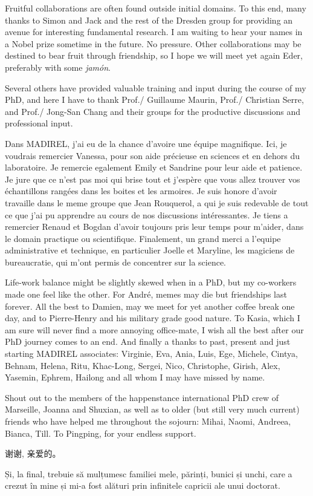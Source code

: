 Fruitful collaborations are often found outside initial domains. 
To this end, many thanks to Simon and Jack and the rest of the Dresden 
group for providing an avenue for interesting fundamental research.
I am waiting to hear your names in a Nobel prize sometime in the
future. No pressure. Other collaborations may be destined to bear fruit
through friendship, so I hope we will meet yet again Eder, preferably 
with some \textit{jamón}.

Several others have provided valuable training and input during the 
course of my PhD, and here I have to thank Prof./ Guillaume Maurin,
Prof./ Christian Serre, and Prof./ Jong-San Chang and their groups
for the productive discussions and professional input.

Dans MADIREL, j'ai eu de la chance d'avoire une équipe magnifique.
Ici, je voudrais remercier Vanessa, pour son aide précieuse en sciences
et en dehors du laboratoire.
Je remercie egalement Emily et Sandrine pour leur aide et patience.
Je jure que ce n'est pas moi qui brise tout et j'espère que vous allez
trouver vos échantillons  rangées dans les boites 
et les armoires. Je suis honore d'avoir travaille dans le meme groupe 
que Jean Rouquerol, a qui je suis redevable de tout ce que j'ai pu apprendre
au cours de nos discussions intéressantes. Je tiens a remercier 
Renaud et Bogdan d'avoir toujours pris leur temps pour m'aider,
dans le domain practique ou scientifique. 
Finalement, un grand merci a l'equipe administrative et technique,
en particulier Joelle et Maryline, les magiciens de bureaucratie, qui 
m'ont permis de concentrer sur la science.

Life-work balance might be slightly skewed when in a PhD, but my
co-workers made one feel like the other. For André, memes may die
but friendships last forever.
All the best to Damien, may we meet for yet another coffee break 
one day, and to Pierre-Henry and his military grade good nature.
To Kasia, which I am sure will never find a more annoying
office-mate, I wish all the best after our PhD journey comes to 
an end.
And finally a thanks to past, present and just starting MADIREL
associates: Virginie, Eva, Ania, Luis, Ege, Michele, Cintya, Behnam, Helena,
Ritu, Khac-Long, Sergei, Nico, Christophe, Girish, Alex, Yasemin, Ephrem, Hailong
and all whom I may have missed by name.

Shout out to the members of the happenstance international PhD crew of Marseille,
Joanna and Shuxian, as well as to older (but still very much current) friends
who have helped me throughout the sojourn: Mihai, Naomi, Andreea, Bianca, Till.
To Pingping, for your endless support. 
\begin{CJK*}{UTF8}{gbsn}
    谢谢, 亲爱的。
\end{CJK*}

Și, la final, trebuie să mulțumesc familiei mele, părinți, bunici și 
unchi, care a crezut în mine și mi-a fost alături prin infinitele 
capricii ale unui doctorat.